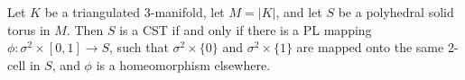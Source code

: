 Let $K$ be a triangulated 3-manifold, let $M = |K|$, and let $S$ be a polyhedral solid torus in $M$. Then $S$ is a CST if and only if there is a PL mapping $\phi: \sigma^2 \times [0, 1] \rightarrow S$, such that $\sigma^2 \times \{0\}$ and $\sigma^2 \times \{1\}$ are mapped onto the same 2-cell in $S$, and $\phi$ is a homeomorphism elsewhere.
